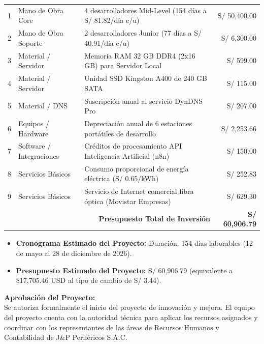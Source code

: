 {\begin{longtable}{@{}p{0.8cm}p{3.8cm}p{7.8cm}r@{}}
        1 & Mano de Obra Core & 4 desarrolladores Mid-Level (154 días a S/ 81.82/día c/u) & S/ 50,400.00 \\
        2 & Mano de Obra Soporte & 2 desarrolladores Junior (77 días a S/ 40.91/día c/u) & S/ 6,300.00 \\
        3 & Material / Servidor & Memoria RAM 32 GB DDR4 (2x16 GB) para Servidor Local & S/ 599.00 \\
        4 & Material / Servidor & Unidad SSD Kingston A400 de 240 GB SATA & S/ 115.00 \\
        5 & Material / DNS & Suscripción anual al servicio DynDNS Pro & S/ 207.00 \\
        6 & Equipos / Hardware & Depreciación anual de 6 estaciones portátiles de desarrollo & S/ 2,253.66 \\
        7 & Software / Integraciones & Créditos de procesamiento API Inteligencia Artificial (n8n) & S/ 150.00 \\
        8 & Servicios Básicos & Consumo proporcional de energía eléctrica (S/ 0.65/kWh) & S/ 252.83 \\
        9 & Servicios Básicos & Servicio de Internet comercial fibra óptica (Movistar Empresas) & S/ 629.30 \\ \midrule
        \multicolumn{3}{r}{\textbf{Presupuesto Total de Inversión}} & \textbf{S/ 60,906.79} \\
    \end{longtable}

    \vspace{0.8em}

    \begin{itemize}[leftmargin=1.5em]
        \item \textbf{Cronograma Estimado del Proyecto:} Duración: 154 días laborables (12 de mayo al 28 de diciembre de 2026).
        \item \textbf{Presupuesto Estimado del Proyecto:} S/ 60,906.79 (equivalente a \$17,705.46 USD al tipo de cambio de S/ 3.44).
    \end{itemize}

    \vspace{0.8em}
    \noindent\textbf{Aprobación del Proyecto:} \\
    Se autoriza formalmente el inicio del proyecto de innovación y mejora. El equipo del proyecto cuenta con la autoridad técnica para aplicar los recursos asignados y coordinar con los representantes de las áreas de Recursos Humanos y Contabilidad de J\&P Periféricos S.A.C.

}
